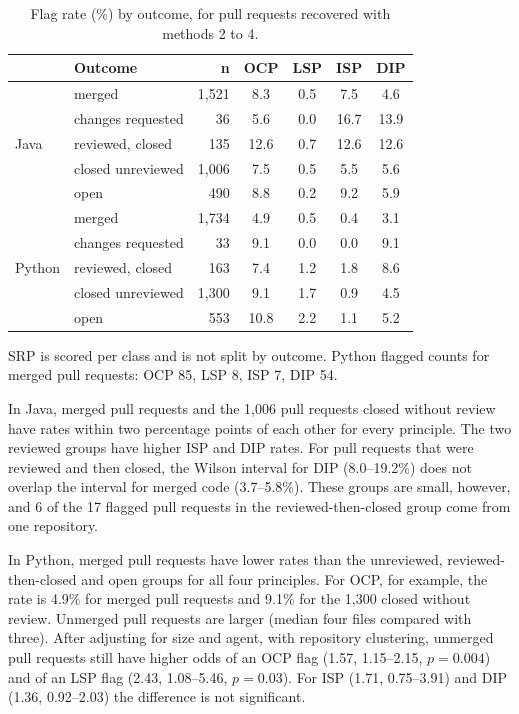 \documentclass[sigconf]{acmart}
\begin{document}
\begin{table}[t]
\caption{Flag rate (\%) by outcome, for pull requests recovered with methods 2 to 4.}
\label{tab:outcome}
\footnotesize
\setlength{\tabcolsep}{3.3pt}
\begin{tabular}{@{}llrcccc@{}}
\toprule
 & \textbf{Outcome} & \textbf{n} & \textbf{OCP} & \textbf{LSP} & \textbf{ISP} & \textbf{DIP} \\
\midrule
\multirow{5}{*}{Java}
 & merged               & 1,521 & 8.3  & 0.5 & 7.5  & 4.6 \\
 & changes requested    &    36 & 5.6  & 0.0 & 16.7 & 13.9 \\
 & reviewed, closed     &   135 & 12.6 & 0.7 & 12.6 & 12.6 \\
 & closed unreviewed    & 1,006 & 7.5  & 0.5 & 5.5  & 5.6 \\
 & open                 &   490 & 8.8  & 0.2 & 9.2  & 5.9 \\
\midrule
\multirow{5}{*}{Python}
 & merged               & 1,734 & 4.9  & 0.5 & 0.4 & 3.1 \\
 & changes requested    &    33 & 9.1  & 0.0 & 0.0 & 9.1 \\
 & reviewed, closed     &   163 & 7.4  & 1.2 & 1.8 & 8.6 \\
 & closed unreviewed    & 1,300 & 9.1  & 1.7 & 0.9 & 4.5 \\
 & open                 &   553 & 10.8 & 2.2 & 1.1 & 5.2 \\
\bottomrule
\end{tabular}

\vspace{3pt}
\raggedright\scriptsize SRP is scored per class and is not split by outcome. Python flagged counts
for merged pull requests: OCP 85, LSP 8, ISP 7, DIP 54.
\end{table}

In Java, merged pull requests and the 1,006 pull requests closed without review have rates within two
percentage points of each other for every principle. The two reviewed groups have higher ISP and DIP
rates. For pull requests that were reviewed and then closed, the Wilson interval for DIP
(8.0--19.2\%) does not overlap the interval for merged code (3.7--5.8\%). These groups are small,
however, and 6 of the 17 flagged pull requests in the reviewed-then-closed group come from one
repository.

In Python, merged pull requests have lower rates than the unreviewed, reviewed-then-closed and open
groups for all four principles. For OCP, for example, the rate is 4.9\% for merged pull requests and
9.1\% for the 1,300 closed without review. Unmerged pull requests are larger (median four files
compared with three). After adjusting for size and agent, with repository clustering, unmerged pull
requests still have higher odds of an OCP flag (1.57, 1.15--2.15, $p = 0.004$) and of an LSP flag
(2.43, 1.08--5.46, $p = 0.03$). For ISP (1.71, 0.75--3.91) and DIP (1.36, 0.92--2.03) the difference
is not significant.
\end{document}
